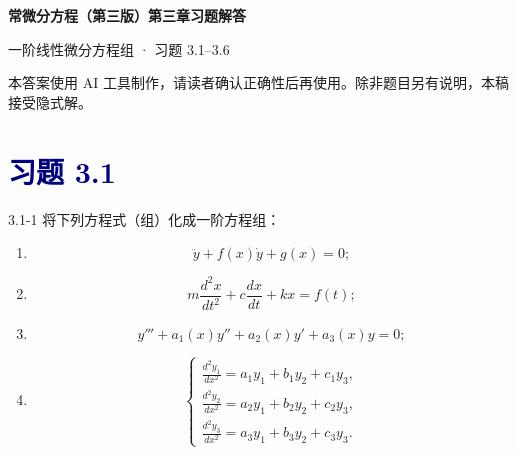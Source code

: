 \documentclass[UTF8,a4paper,11pt]{ctexart}
\newcommand{\sect}[1]{\section*{\textcolor{navy}{习题 #1}}}
\begin{document}
\begin{center}
  {\LARGE\bfseries\color{navy}常微分方程（第三版）第三章习题解答\par}
  \vspace{0.35em}
  {\color{pink}一阶线性微分方程组 · 习题 3.1--3.6\par}
\end{center}
\begin{center}
  \small\color{gray}本答案使用 AI 工具制作，请读者确认正确性后再使用。除非题目另有说明，本稿接受隐式解。
\end{center}
\sect{3.1}
\begin{problem}{3.1-1}
将下列方程式（组）化成一阶方程组：
  \begin{enumerate}[label=(\arabic*)]
    \item
    \[
      \ddot y+f(x)\dot y+g(x)=0;
    \]

    \item
    \[
      m\frac{d^2x}{dt^2}
      +c\frac{dx}{dt}
      +kx=f(t);
    \]

    \item
    \[
      y'''+a_1(x)y''+a_2(x)y'+a_3(x)y=0;
    \]

    \item
    \[
    \begin{cases}
      \displaystyle \frac{d^2y_1}{dx^2}
      =a_1y_1+b_1y_2+c_1y_3,\\[6pt]
      \displaystyle \frac{d^2y_2}{dx^2}
      =a_2y_1+b_2y_2+c_2y_3,\\[6pt]
      \displaystyle \frac{d^2y_3}{dx^2}
      =a_3y_1+b_3y_2+c_3y_3.
    \end{cases}
    \]
  \end{enumerate}
\end{problem}
\end{document}
